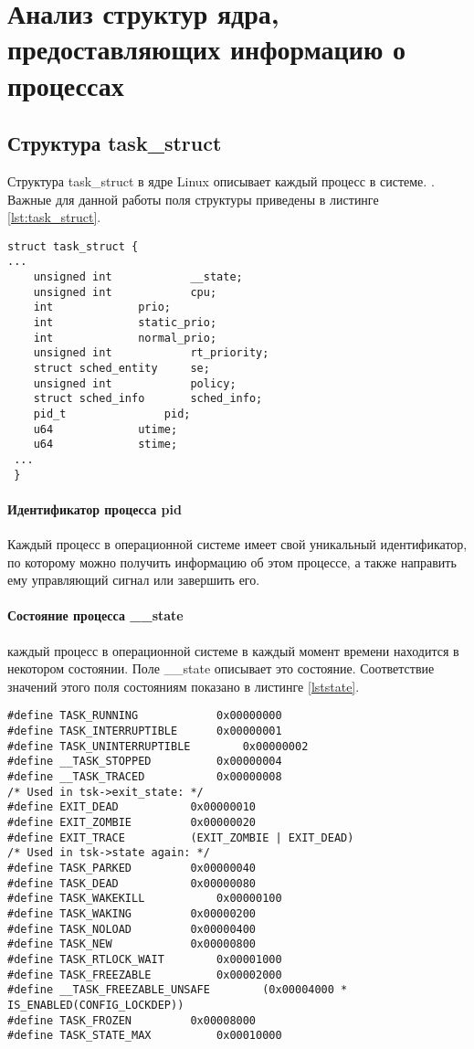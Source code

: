 \section{Анализ структур ядра, предоставляющих информацию о процессах}

\subsection{Структура task\_struct}

Структура task\_struct в ядре Linux описывает каждый процесс в системе. \cite{bib:3}. Важные для данной работы поля структуры приведены в листинге \ref{lst:task_struct}. 

\begin{lstlisting}[label=lst:task_struct,caption=Структура task\_strcut.]
struct task_struct {
...
	unsigned int			__state;
	unsigned int			cpu;
	int				prio;
	int				static_prio;
	int				normal_prio;
	unsigned int			rt_priority;
	struct sched_entity		se;
    unsigned int			policy;
    struct sched_info		sched_info;
 	pid_t				pid;
	u64				utime;
	u64				stime;
 ...
 }
\end{lstlisting}

\paragraph*{Идентификатор процесса pid} Каждый процесс в операционной системе имеет свой уникальный идентификатор, по которому можно получить информацию об этом процессе, а также направить ему управляющий сигнал или завершить его.

\paragraph*{Состояние процесса \_\_state} каждый процесс в операционной системе в каждый момент времени находится в некотором состоянии. Поле \_\_state описывает это состояние. Соответствие значений этого поля состояниям показано в листинге \ref{lststate}. 
\begin{lstlisting}[label=lststate,caption=Соответствие значений поля \_\_state состояниям процесса]
#define TASK_RUNNING			0x00000000
#define TASK_INTERRUPTIBLE		0x00000001
#define TASK_UNINTERRUPTIBLE		0x00000002
#define __TASK_STOPPED			0x00000004
#define __TASK_TRACED			0x00000008
/* Used in tsk->exit_state: */
#define EXIT_DEAD			0x00000010
#define EXIT_ZOMBIE			0x00000020
#define EXIT_TRACE			(EXIT_ZOMBIE | EXIT_DEAD)
/* Used in tsk->state again: */
#define TASK_PARKED			0x00000040
#define TASK_DEAD			0x00000080
#define TASK_WAKEKILL			0x00000100
#define TASK_WAKING			0x00000200
#define TASK_NOLOAD			0x00000400
#define TASK_NEW			0x00000800
#define TASK_RTLOCK_WAIT		0x00001000
#define TASK_FREEZABLE			0x00002000
#define __TASK_FREEZABLE_UNSAFE	       (0x00004000 * IS_ENABLED(CONFIG_LOCKDEP))
#define TASK_FROZEN			0x00008000
#define TASK_STATE_MAX			0x00010000
\end{lstlisting}

